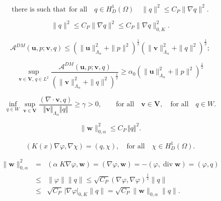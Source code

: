 \documentclass[11pt]{article}
\begin{document}
\begin{equation}\label{Poincare}
\text{there is  such that} ~~\mbox{for all}\quad 
q \in H^1_D(\Omega) \quad
\|q\|^2 \le C_P \| \nabla q\|^2. 
\end{equation}

$$
\|q\|^2 \le C_P \| \nabla q\|^2 \le 
C_P \|\nabla q\|^2_{0,K}.
$$

\begin{equation}\label{continuity}
{{\mathcal A}}^{DM}({{\mathbf u}},p; {{\mathbf v}},q) 
\le ( \|{{\mathbf u}}\|^2_{\Lambda_{{\alpha}}} +\|p\|^2)^\frac12( \|{{\mathbf v}}\|^2_{\Lambda_{{\alpha}}} +\|q\|^2)^\frac12;
\end{equation}

\begin{equation}\label{A-infsup}
\sup_{{{\mathbf v}} \in {{\boldsymbol V}}, \, q \in L^2} 
\frac{{{\mathcal A}}^{DM}({{\mathbf u}},p; {{\mathbf v}},q) }{(\|{{\mathbf v}}\|^2_{\Lambda_{{\alpha}}} +\|q\|^2)^\frac12} 
\ge \alpha_0 ( \|{{\mathbf u}}\|^2_{\Lambda_{{\alpha}}} +\|p\|^2 )^\frac12
\end{equation}

\begin{equation}\label{inf_sup_stab_var}
  \inf_{q\in W} \sup_{{{\mathbf v}}\in{{\boldsymbol V}}}\frac{(\nabla\cdot {{\mathbf v}},q)}{\Vert {{\mathbf v}} \Vert_{\Lambda_{{\alpha}}}
\Vert q \Vert}\ge 
\gamma >0, \qquad \mbox{for all}\quad {{\mathbf v}}\in{{\boldsymbol V}},\quad \mbox{for all}\quad q\in W. 
 \end{equation}

\begin{equation}\label{lem:stab_var_1}
\|{{\mathbf w}}\|_{0,\alpha}^2\le C_P \, \Vert q \Vert^2.
\end{equation}

\begin{equation}\label{eq:standard-variational}
( K(x) \nabla \varphi,\nabla\chi ) = (q, \chi), 
\quad \mbox{for all}\quad \chi\in H_D^1(\Omega).
\end{equation}

\begin{eqnarray*}
\|{{\mathbf w}}\|_{0,\alpha}^2& = & 
(\alpha\;K\nabla\varphi,{{\mathbf w}})= (\nabla\varphi,{{\mathbf w}})
= -(\varphi,{\operatorname{div}} {{\mathbf w}})=(\varphi, q)\\ &\le& 
\|\varphi\|\|q\|
\le \sqrt{C_P}(\nabla\varphi,\nabla\varphi)^\frac12 \|q\|\\
&\le& \sqrt{C_P} \,|\nabla\varphi|_{0,K}\|q\|
= \sqrt{C_P} \|{{\mathbf w}}\|_{0,\alpha}\|q\|.
\end{eqnarray*}
\end{document}
